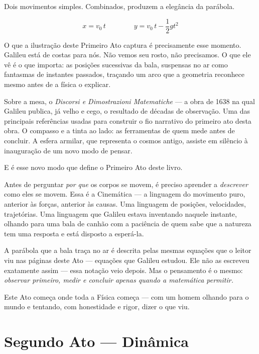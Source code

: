 Dois movimentos simples. Combinados, produzem a elegância da parábola.

\begin{equation*}
    x = v_0\, t \qquad\qquad y = v_0\, t - \frac{1}{2}g t^2
\end{equation*}

O que a ilustração deste Primeiro Ato captura é precisamente esse
momento. Galileu está de costas para nós.
Não vemos seu rosto, não precisamos. O que ele vê é o que importa: as
posições sucessivas da bala, suspensas no ar como fantasmas de instantes
passados, traçando um arco que a geometria reconhece mesmo antes de a
física o explicar.

Sobre a mesa, o \textit{Discorsi e Dimostrazioni Matematiche} --- a obra
de 1638 na qual Galileu publica, já velho e cego, o resultado de décadas
de observação. Uma das principais referências usadas para construir o fio narrativo do primeiro ato desta obra. O compasso e a tinta ao lado: as ferramentas de quem mede
antes de concluir. A esfera armilar, que representa o cosmos antigo,
assiste em silêncio à inauguração de um novo modo de pensar.

E é esse novo modo que define o Primeiro Ato deste livro.

Antes de perguntar \textit{por que} os corpos se movem, é preciso
aprender a \textit{descrever} como eles se movem. Essa é a Cinemática
--- a linguagem do movimento puro, anterior às forças, anterior às
causas. Uma linguagem de posições, velocidades, trajetórias. Uma
linguagem que Galileu estava inventando naquele instante, olhando para
uma bala de canhão com a paciência de quem sabe que a natureza tem uma
resposta e está disposto a esperá-la.

A parábola que a bala traça no ar é descrita pelas mesmas equações que o leitor viu nas páginas deste Ato --- equações que Galileu estudou.
Ele não as escreveu exatamente assim --- essa notação veio depois. Mas o
pensamento é o mesmo: \textit{observar primeiro, medir e concluir
apenas quando a matemática permitir.}

Este Ato começa onde toda a Física começa --- com um homem olhando para
o mundo e tentando, com honestidade e rigor, dizer o que viu.







\section*{Segundo Ato --- Dinâmica}

